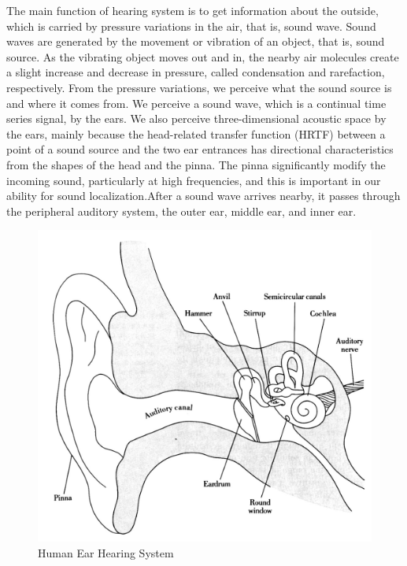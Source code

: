 The main function of hearing system is to get information about the outside, which is
carried by pressure variations in the air, that is, sound wave. Sound waves are
generated by the movement or vibration of an object, that is, sound source. As the
vibrating object moves out and in, the nearby air molecules create a slight increase
and decrease in pressure, called condensation and rarefaction, respectively. From the
pressure variations, we perceive what the sound source is and where it comes from.
We perceive a sound wave, which is a continual time series signal, by the ears.
We also perceive three-dimensional acoustic space by the ears, mainly because the
head-related transfer function (HRTF) between a point of a sound source and
the two ear entrances has directional characteristics from the shapes of the head and
the pinna. The pinna significantly modify the incoming sound, particularly at
high frequencies, and this is important in our ability for sound localization.After 
a sound wave arrives nearby, it passes through the peripheral auditory system, 
the outer ear, middle ear, and inner ear.
\begin{figure}[h]
	\begin{center}
		\includegraphics[scale=0.8]{images/ear_clear.jpg}
		\caption{Human Ear Hearing System}
	\end{center}
\end{figure} 

